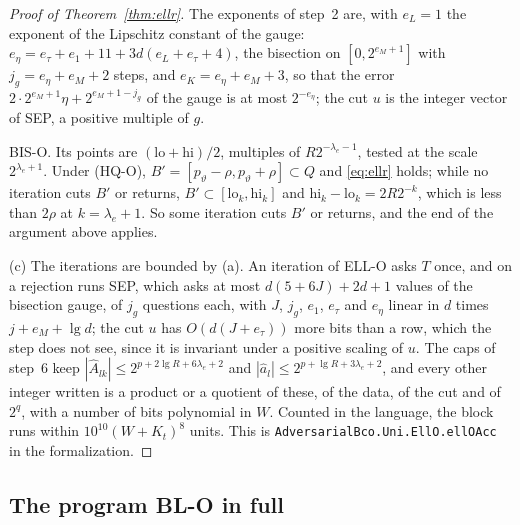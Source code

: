 \documentclass[11pt]{amsart}
\theoremstyle{definition}
\numberwithin{equation}{section}
\begin{document}
\begin{proof}[Proof of Theorem~\ref{thm:ellr}]
The exponents of step~2 are, with $e_L=1$ the exponent of the Lipschitz constant of the gauge: $e_\eta=e_\tau+e_1+11+3d(e_L+e_\tau+4)$, the bisection on $[0,2^{e_M+1}]$ with $j_g=e_\eta+e_M+2$ steps, and $e_K=e_\eta+e_M+3$, so that the error $2\cdot2^{e_M+1}\eta+2^{e_M+1-j_g}$ of the gauge is at most $2^{-e_\eta}$; the cut $u$ is the integer vector of SEP, a positive multiple of $g$.

BIS-O. Its points are $(\mathrm{lo}+\mathrm{hi})/2$, multiples of $R2^{-\lambda_e-1}$, tested at the scale $2^{\lambda_e+1}$. Under (HQ-O), $B'=[p_\vartheta-\rho,p_\vartheta+\rho]\subset Q$ and \eqref{eq:ellr} holds; while no iteration cuts $B'$ or returns, $B'\subset[\mathrm{lo}_k,\mathrm{hi}_k]$ and $\mathrm{hi}_k-\mathrm{lo}_k=2R2^{-k}$, which is less than $2\rho$ at $k=\lambda_e+1$. So some iteration cuts $B'$ or returns, and the end of the argument above applies.

(c) The iterations are bounded by (a). An iteration of ELL-O asks $T$ once, and on a rejection runs SEP, which asks at most $d(5+6J)+2d+1$ values of the bisection gauge, of $j_g$ questions each, with $J$, $j_g$, $e_1$, $e_\tau$ and $e_\eta$ linear in $d$ times $j+e_M+\lg d$; the cut $u$ has $O(d(J+e_\tau))$ more bits than a row, which the step does not see, since it is invariant under a positive scaling of $u$. The caps of step~6 keep $|\hat A_{lk}|\le2^{p+2\lg R+6\lambda_e+2}$ and $|\hat a_l|\le2^{p+\lg R+3\lambda_e+2}$, and every other integer written is a product or a quotient of these, of the data, of the cut and of $2^q$, with a number of bits polynomial in $W$. Counted in the language, the block runs within $10^{10}(W+K_t)^8$ units.
This is \texttt{AdversarialBco.Uni.EllO.ellOAcc} in the formalization.
\end{proof}

\subsection{The program BL-O in full}
\end{document}
